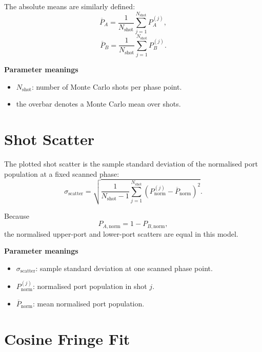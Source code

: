 \documentclass[11pt,a4paper]{article}
\begin{document}
The absolute means are similarly defined:
\begin{equation}
  \overline{P}_A =
  \frac{1}{N_{\mathrm{shot}}}
  \sum_{j=1}^{N_{\mathrm{shot}}} P_A^{(j)},
\end{equation}
\begin{equation}
  \overline{P}_B =
  \frac{1}{N_{\mathrm{shot}}}
  \sum_{j=1}^{N_{\mathrm{shot}}} P_B^{(j)}.
\end{equation}

\textbf{Parameter meanings}
\begin{itemize}[leftmargin=1.5em]
  \item $N_{\mathrm{shot}}$: number of Monte Carlo shots per phase point.
  \item the overbar denotes a Monte Carlo mean over shots.
\end{itemize}

\section{Shot Scatter}

The plotted shot scatter is the sample standard deviation of the normalised port population at a fixed scanned phase:
\begin{equation}
  \sigma_{\mathrm{scatter}} =
  \sqrt{
    \frac{1}{N_{\mathrm{shot}}-1}
    \sum_{j=1}^{N_{\mathrm{shot}}}
    \left(P_{\mathrm{norm}}^{(j)} - \overline{P}_{\mathrm{norm}}\right)^2
  }.
\end{equation}

Because
\begin{equation}
  P_{A,\mathrm{norm}} = 1 - P_{B,\mathrm{norm}},
\end{equation}
the normalised upper-port and lower-port scatters are equal in this model.

\textbf{Parameter meanings}
\begin{itemize}[leftmargin=1.5em]
  \item $\sigma_{\mathrm{scatter}}$: sample standard deviation at one scanned phase point.
  \item $P_{\mathrm{norm}}^{(j)}$: normalised port population in shot $j$.
  \item $\overline{P}_{\mathrm{norm}}$: mean normalised port population.
\end{itemize}

\section{Cosine Fringe Fit}
\end{document}
